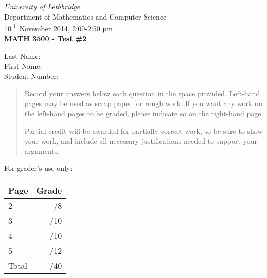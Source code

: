 \documentclass[12pt]{article}
\newcommand{\skipline}{\vspace{12pt}}
\begin{document}
\author{Instructor: Sean Fitzpatrick}
\thispagestyle{plain}
\begin{center}
\emph{University of Lethbridge}\\
Department of Mathematics and Computer Science\\
10\textsuperscript{th} November 2014, 2:00-2:50 pm\\
{\bf MATH 3500 - Test \#2}\\
\end{center}
\skipline \skipline \skipline \noindent \skipline
Last Name:\underline{\hspace{50pt}{\bf Solutions}\hspace{248pt}}\\
\skipline
First Name:\underline{\hspace{50pt}{\bf The}\hspace{275pt}}\\
\skipline
Student Number:\underline{\hspace{322pt}}\\
\skipline

\vspace{0.5in}


\begin{quote}

 
 {Record your answers below each question in the space provided.    Left-hand pages may be used as scrap paper for rough work.  If you want any work on the left-hand pages to be graded, please indicate so on the right-hand page.
 
 \bigskip
 
Partial credit will be awarded for partially correct work, so be sure to show your work, and include all necessary justifications needed to support your arguments. }

\end{quote}


\vspace{0.5in}

For grader's use only:

\begin{table}[hbt]
\begin{center}
\begin{tabular}{|l|r|} \hline
Page&Grade\\
\hline \hline
\cline{1-2} 2 & \enspace\enspace\enspace\enspace\enspace\enspace/8\\
\cline{1-2} 3 & \enspace\enspace\enspace\enspace\enspace\enspace/10\\
\cline{1-2} 4 & \enspace\enspace\enspace\enspace\enspace\enspace/10\\
\cline{1-2} 5 & \enspace\enspace\enspace\enspace\enspace\enspace/12\\
\cline{1-2} Total & \enspace\enspace\enspace\enspace\enspace\enspace/40\\
\hline
\end{tabular}

\skipline

\skipline

\skipline

\end{center}
\end{table}
\newpage
\end{document}
